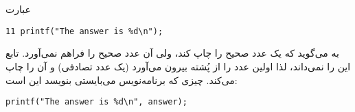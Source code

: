 \section{}
\paragraph{}\label{answer:85}
عبارت
\begin{LTR}
        \begin{lstlisting}[style=C++Style]
            11 printf("The answer is %d\n");
        \end{lstlisting}
\end{LTR}
به  می‌گوید که یک عدد صحیح را چاپ کند، ولی آن عدد صحیح را فراهم نمی‌آورد. تابع  این را نمی‌داند، لذا اولین عدد را از پُشته بیرون می‌آورد (یک عدد تصادفی) و آن را چاپ می‌کند. چیزی که برنامه‌نویس می‌بایستی بنویسد این است:
\begin{LTR}
        \begin{lstlisting}[style=C++Style]
            printf("The answer is %d\n", answer);
        \end{lstlisting}
\end{LTR}

